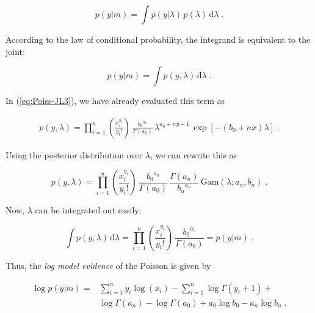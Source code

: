\begin{equation} \label{eq:Poiss-ME1}
p(y|m) = \int p(y|\lambda) \, p(\lambda) \, \mathrm{d}\lambda \; .
\end{equation}

According to the law of conditional probability, the integrand is equivalent to the joint:

\begin{equation} \label{eq:Poiss-ME2}
p(y|m) = \int p(y,\lambda) \, \mathrm{d}\lambda \; .
\end{equation}

In (\ref{eq:Poiss-JL3}), we have already evaluated this term as

\vspace{-0.5em}
\begin{equation} \label{eq:Poiss-LME1}
\begin{split}
p(y,\lambda) = \prod_{i=1}^n \left( \frac{x_i^{y_i}}{y_i !} \right) \, \frac{{b_0}^{a_0}}{\Gamma(a_0)} \, \lambda^{a_0 + n \bar{y} - 1} \, \exp[-(b_0 + n \bar{x}) \lambda] \; .
\end{split}
\end{equation}

\pagebreak
Using the posterior distribution over $\lambda$, we can rewrite this as

\begin{equation} \label{eq:Poiss-LME2}
p(y,\lambda) = \prod_{i=1}^n \left( \frac{x_i^{y_i}}{y_i !} \right) \, \frac{{b_0}^{a_0}}{\Gamma(a_0)} \, \frac{\Gamma(a_n)}{{b_n}^{a_n}} \, \mathrm{Gam}(\lambda; a_n, b_n) \; .
\end{equation}

Now, $\lambda$ can be integrated out easily:

\begin{equation} \label{eq:Poiss-LME3}
\int p(y,\lambda) \, \mathrm{d}\lambda = \prod_{i=1}^n \left( \frac{x_i^{y_i}}{y_i !} \right) \, \frac{{b_0}^{a_0}}{\Gamma(a_0)} = p(y|m) \; .
\end{equation}

Thus, the \textit{log model evidence} of the Poisson is given by

\vspace{-0.5em}
\begin{equation} \label{eq:Poiss-LME4}
\begin{split}
\log p(y|m) = &\sum_{i=1}^n y_i \log(x_i) - \sum_{i=1}^n \log \Gamma(y_i + 1) + \\ 
&\log \Gamma(a_n) - \log \Gamma(a_0) + a_0 \log b_0 - a_n \log b_n \; .
\end{split}
\end{equation}


